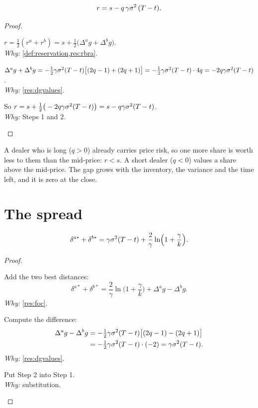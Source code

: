\begin{result}
\label{res:r}
\[
  r=s-q\,\gamma\sigma^2\,(T-t) .
\]
\end{result}

\begin{proof}
\begin{steps}
  \item $r=\tfrac12(r^a+r^b)=s+\tfrac12\big(\Delta^ag+\Delta^bg\big)$.
  \\ \emph{Why:} \cref{def:reservation,res:rbra}.
  \item $\Delta^ag+\Delta^bg=-\tfrac12\gamma\sigma^2(T-t)\big[(2q-1)+(2q+1)\big]=-\tfrac12\gamma\sigma^2(T-t)\cdot4q=-2q\gamma\sigma^2(T-t)$.
  \\ \emph{Why:} \cref{res:dgvalues}.
  \item So $r=s+\tfrac12\big(-2q\gamma\sigma^2(T-t)\big)=s-q\gamma\sigma^2(T-t)$.
  \\ \emph{Why:} Steps 1 and 2.
\end{steps}
\end{proof}

\begin{intuition}
A dealer who is long ($q>0$) already carries price risk, so one more share is worth less to them than the mid-price: $r<s$. A short dealer ($q<0$) values a share above the mid-price. The gap grows with the inventory, the variance and the time left, and it is zero at the close.
\end{intuition}

\section{The spread}

\begin{result}
\label{res:spread}
\[
  \delta^{a*}+\delta^{b*}=\gamma\sigma^2(T-t)+\frac2\gamma\ln\!\Big(1+\frac\gamma k\Big).
\]
\end{result}

\begin{proof}
\begin{steps}
  \item Add the two best distances:
  \[
    \delta^{a*}+\delta^{b*}=\frac2\gamma\ln\!\Big(1+\frac\gamma k\Big)+\Delta^ag-\Delta^bg.
  \]
  \emph{Why:} \cref{res:foc}.
  \item Compute the difference:
  \[
    \begin{aligned}
      \Delta^ag-\Delta^bg&=-\tfrac12\gamma\sigma^2(T-t)\big[(2q-1)-(2q+1)\big]\\
      &=-\tfrac12\gamma\sigma^2(T-t)\cdot(-2)=\gamma\sigma^2(T-t).
    \end{aligned}
  \]
  \emph{Why:} \cref{res:dgvalues}.
  \item Put Step 2 into Step 1.
  \\ \emph{Why:} substitution.
\end{steps}
\end{proof}

